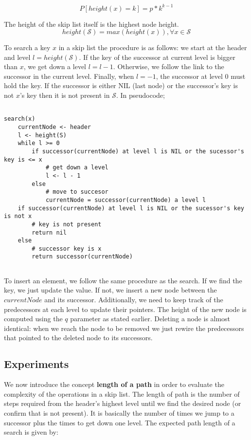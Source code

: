 \documentclass[a4paper,10pt,table,xcdraw]{article}
\begin{document}
\[P[height(x)=k] = p*k^{k-1} \]

The height of the skip list itself is the highest node height.
\[height(\mathcal{S}) = max(height(x)), \forall x \in \mathcal{S}\]

To search a key $x$ in a skip list the procedure is as follows: we start at the header and level $l=height(\mathcal{S})$. If the key of the successor at current level is bigger than $x$, we get down a level $l = l - 1$. Otherwise, we follow the link to the successor in the current level. Finally, when $l=-1$, the successor at level 0 must hold the key. If the successor is either NIL (last node) or the successor's key is not $x$'s key then it is not present in $\mathcal{S}$. In pseudocode;

\begin{verbatim}

search(x)
    currentNode <- header
    l <- height(S)
    while l >= 0
        if successor(currentNode) at level l is NIL or the sucessor's key is <= x 
            # get down a level
            l <- l - 1 
        else 
            # move to succesor
            currentNode = successor(currentNode) a level l
    if successor(currentNode) at level l is NIL or the sucessor's key is not x 
        # key is not present
        return nil
    else
        # successor key is x
        return successor(currentNode)
	
\end{verbatim}

To insert an element, we follow the same procedure as the search. If we find the key, we just update the value. If not, we insert a new node between the $currentNode$ and its successor. Additionally, we need to keep track of the predecessors at each level to update their pointers. The height of the new node is computed using the $q$ parameter as stated earlier. Deleting a node is almost identical: when we reach the node to be removed we just rewire the predecessors that pointed to the deleted node to its successors.


\subsection{Experiments}

We now introduce the concept \textbf{length of a path} in order to evaluate the complexity of the operations in a skip list. The length of path is the number of steps required from the header's highest level until we find the desired node (or confirm that is not present). It is basically the number of times we jump to a successor plus the times to get down one level. The expected path length of a search is given by:
\end{document}

